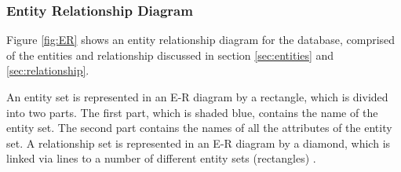 \FloatBarrier
\begin{table}[htbp]
\centering
{}
\caption{Table showing entities, relationships between, relationship attributes, participation and cardinality.}
\label{tab:er3}
\end{table}
\FloatBarrier

\subsubsection{Entity Relationship Diagram}\label{sec:er}

Figure \ref{fig:ER} shows an entity relationship diagram for the database, comprised of the entities and relationship discussed in section \ref{sec:entities} and \ref{sec:relationship}.

An entity set is represented in an E-R diagram by a rectangle, which is divided into two parts. The first part, which is shaded blue, contains the name of the entity set. The second part contains the names of all the attributes of the entity set. A relationship set is represented in an E-R diagram by a diamond, which is linked via lines to a number of different entity sets (rectangles) \cite{db}. 

